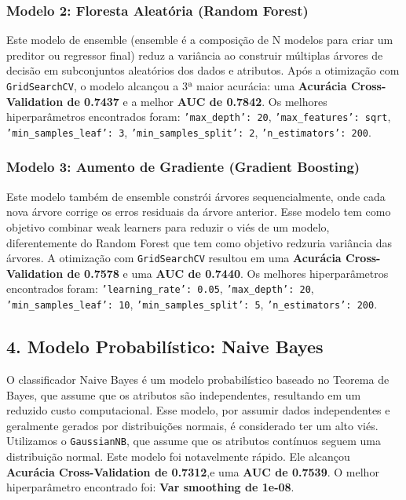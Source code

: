 \subsubsection*{Modelo 2: Floresta Aleatória (Random Forest)}
Este modelo de ensemble (ensemble é a composição de N modelos para criar um preditor ou regressor final) reduz a variância ao construir múltiplas árvores de decisão em subconjuntos aleatórios dos dados e atributos.
Após a otimização com \texttt{GridSearchCV}, o modelo alcançou a 3ª maior acurácia: uma \textbf{Acurácia Cross-Validation de 0.7437}  e a melhor \textbf{AUC de 0.7842}. 
Os melhores hiperparâmetros encontrados foram: \texttt{'max\_depth': 20}, \texttt{'max\_features': sqrt}, \texttt{'min\_samples\_leaf': 3}, \texttt{'min\_samples\_split': 2}, \texttt{'n\_estimators': 200}.
\vspace{5mm}
\subsubsection*{Modelo 3: Aumento de Gradiente (Gradient Boosting)}
Este modelo também de ensemble constrói árvores sequencialmente, onde cada nova árvore corrige os erros residuais da árvore anterior. Esse modelo tem como objetivo combinar weak learners para reduzir o viés de um modelo, diferentemente do Random Forest que tem como objetivo redzuria  variância das árvores.
A otimização com \texttt{GridSearchCV} resultou em uma \textbf{Acurácia Cross-Validation de 0.7578}  e uma \textbf{AUC de 0.7440}.
Os melhores hiperparâmetros encontrados foram: \texttt{'learning\_rate': 0.05}, \texttt{'max\_depth': 20}, \texttt{'min\_samples\_leaf': 10}, \texttt{'min\_samples\_split': 5}, \texttt{'n\_estimators': 200}.
\vspace{5mm}
\subsection*{4. Modelo Probabilístico: Naive Bayes}
O classificador Naive Bayes é um modelo probabilístico baseado no Teorema de Bayes, que assume que os atributos são independentes, resultando em um reduzido custo computacional. Esse modelo, por assumir dados independentes e geralmente gerados por distribuições normais, é considerado ter um alto viés.
Utilizamos o \texttt{GaussianNB}, que assume que os atributos contínuos seguem uma distribuição normal.
Este modelo foi notavelmente rápido. Ele alcançou \textbf{Acurácia Cross-Validation de 0.7312},e uma \textbf{AUC de 0.7539}. O melhor hiperparâmetro encontrado foi: \textbf{Var smoothing de 1e-08}.
\vspace{5mm}
